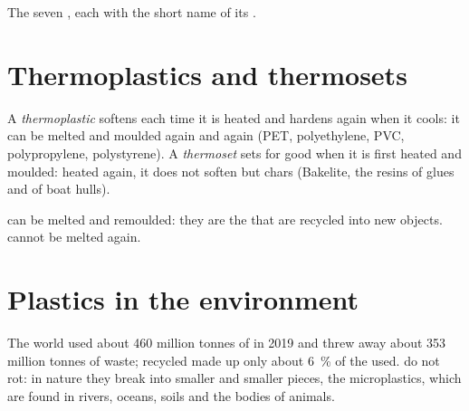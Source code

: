 \begin{omfigure}

{\small The seven , each with the short name of
its .}
\end{omfigure}

\section{Thermoplastics and thermosets}

\begin{definition}\label{def:g8:plastics:thermoplastic}
A \emph{thermoplastic} softens each time it is
heated and hardens again when it cools: it can be melted and moulded
again and again (PET, polyethylene, PVC, polypropylene, polystyrene). A
\emph{thermoset} sets for good when it is first heated
and moulded: heated again, it does not soften but chars (Bakelite, the
resins of glues and of boat hulls).
\end{definition}

\begin{remark}\label{rem:g8:plastics:which}
 can be melted and remoulded: they are the  that
are recycled into new objects.  cannot be melted again.
\end{remark}

\section{Plastics in the environment}

\begin{proposition}\label{prop:g8:plastics:last}
The world used about 460 million tonnes of  in 2019 and threw
away about 353 million tonnes of  waste; recycled  made up
only about \qty{6}{\percent} of the  used.  do not rot:
in nature they break into smaller and smaller pieces, the microplastics,
which are found in rivers, oceans, soils and the bodies of animals.
\end{proposition}

